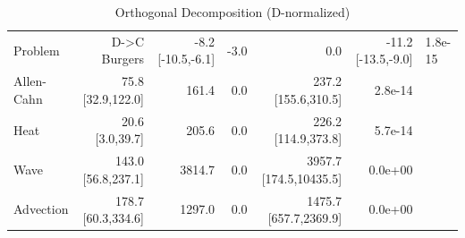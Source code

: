 \begin{table}[htbp]
\centering
\caption{Orthogonal Decomposition (D-normalized)}
\label{tab:decomp}
\begin{tabular}{lrrrrr}
\hline
Problem & D->C %
\hline
Burgers & -8.2 [-10.5,-6.1] & -3.0 & 0.0 & -11.2 [-13.5,-9.0] & 1.8e-15 \\
Allen-Cahn & 75.8 [32.9,122.0] & 161.4 & 0.0 & 237.2 [155.6,310.5] & 2.8e-14 \\
Heat & 20.6 [3.0,39.7] & 205.6 & 0.0 & 226.2 [114.9,373.8] & 5.7e-14 \\
Wave & 143.0 [56.8,237.1] & 3814.7 & 0.0 & 3957.7 [174.5,10435.5] & 0.0e+00 \\
Advection & 178.7 [60.3,334.6] & 1297.0 & 0.0 & 1475.7 [657.7,2369.9] & 0.0e+00 \\
\hline
\end{tabular}
\end{table}
